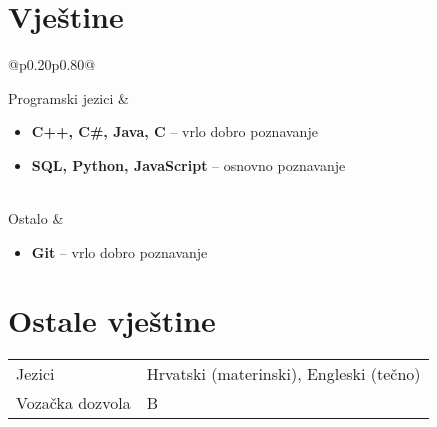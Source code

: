 \documentclass[a4paper]{article}
\makeatletter
\newlength{\tablewidth}
\newenvironment{skills}{%
\setlength{\tablewidth}{\linewidth}
\addtolength{\tablewidth}{-2\tabcolsep}
\begin{tabular}{@{}p{0.20\tablewidth}p{0.80\tablewidth}@{}}
}{%
\end{tabular}
}
\makeatother
\begin{document}
\section{Vje\v{s}tine}
\begin{skills}
	Programski jezici &
	\begin{itemize}
		\item \textbf{C++, C\#, Java, C} -- vrlo dobro poznavanje
		\item \textbf{SQL, Python, JavaScript} -- osnovno poznavanje
	\end{itemize} \\
	Ostalo &
	\begin{itemize}
		\item \textbf{Git} -- vrlo dobro poznavanje
	\end{itemize}
\end{skills}

\section{Ostale vje\v{s}tine}
\begin{skills}
    Jezici & Hrvatski (materinski), Engleski (te\v{c}no) \\
    Voza\v{c}ka dozvola & B \\
\end{skills}
\end{document}
